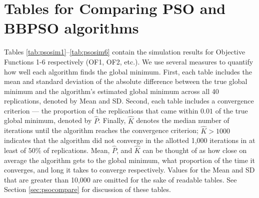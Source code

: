 \documentclass[cmbright]{staauth}
\numberwithin{table}{section}
\begin{document}
\section{Tables for Comparing PSO and BBPSO algorithms}\label{app:psotabs}

Tables \ref{tab:psosim1}--\ref{tab:psosim6} contain the simulation results for Objective Functions 1-6 respectively (OF1, OF2, etc.). We use several measures to quantify how well each algorithm finds the global minimum. First, each table includes the mean and standard deviation of the absolute difference between the true global minimum and the algorithm's estimated global minimum across all 40 replications, denoted by Mean and SD. Second, each table includes a convergence criterion --- the proportion of the replications that came within $0.01$ of the true global minimum, denoted by $\widehat{P}$. Finally, $\widehat{K}$ denotes the median number of iterations until the algorithm reaches the convergence criterion; $\widehat{K} > 1000$ indicates that the algorithm did not converge in the allotted 1,000 iterations in at least of $50\%$ of replications. Mean, $\widehat{P}$, and $\widehat{K}$ can be thought of as how close on average the algorithm gets to the global minimum, what proportion of the time it converges, and long it takes to converge respectively. Values for the Mean and SD that are greater than 10,000 are omitted for the sake of readable tables. See Section \ref{sec:psocompare} for discussion of these tables.
\end{document}
